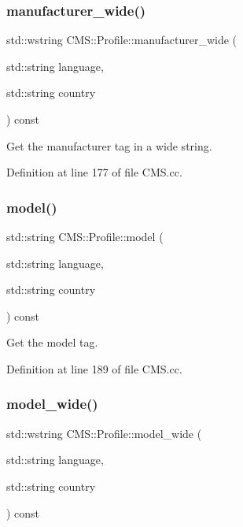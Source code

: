 \subsubsection{\texorpdfstring{manufacturer\+\_\+wide()}{manufacturer\_wide()}}
{\footnotesize\ttfamily std\+::wstring C\+M\+S\+::\+Profile\+::manufacturer\+\_\+wide (\begin{DoxyParamCaption}\item[{std\+::string}]{language,  }\item[{std\+::string}]{country }\end{DoxyParamCaption}) const}



Get the manufacturer tag in a wide string. 



Definition at line 177 of file C\+M\+S.\+cc.

\mbox{\label{class_c_m_s_1_1_profile_a53625142c46b1ae35c5273bd9221b4c5}} 
\subsubsection{\texorpdfstring{model()}{model()}}
{\footnotesize\ttfamily std\+::string C\+M\+S\+::\+Profile\+::model (\begin{DoxyParamCaption}\item[{std\+::string}]{language,  }\item[{std\+::string}]{country }\end{DoxyParamCaption}) const}



Get the model tag. 



Definition at line 189 of file C\+M\+S.\+cc.

\mbox{\label{class_c_m_s_1_1_profile_abc14007394d919335db466432570c569}} 
\subsubsection{\texorpdfstring{model\+\_\+wide()}{model\_wide()}}
{\footnotesize\ttfamily std\+::wstring C\+M\+S\+::\+Profile\+::model\+\_\+wide (\begin{DoxyParamCaption}\item[{std\+::string}]{language,  }\item[{std\+::string}]{country }\end{DoxyParamCaption}) const}



